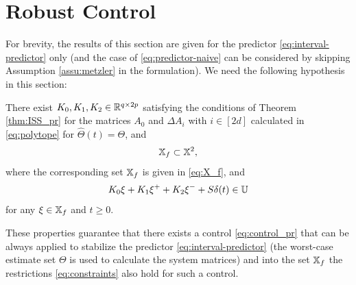 \documentclass[letterpaper, 10 pt, conference]{ieeeconf}  %
\begin{document}
\section{\label{sec:control} Robust Control}

For brevity, the results of this section are given for the predictor
\eqref{eq:interval-predictor} only (and the case of \eqref{eq:predictor-naive}
can be considered by skipping Assumption \ref{assu:metzler} in the
formulation). We need the following hypothesis in this section:
\begin{assumption}
\label{assu:ctrl} There exist $K_{0},K_{1},K_{2}\in\mathbb{R}^{q\times2p}$
satisfying the conditions of Theorem \ref{thm:ISS_pr} for the matrices
$A_{0}$ and $\Delta A_{i}$ with $i\in[2d]$ calculated in \eqref{eq:polytope}
for $\hat{\Theta}(t)=\Theta$, and
\[
\mathbb{X}_{f}\subset\mathbb{X}^{2},
\]
where the corresponding set $\mathbb{X}_{f}$ is given in \eqref{eq:X_f},
and
\[
K_{0}\xi+K_{1}\xi^{+}+K_{2}\xi^{-}+S\delta(t)\in\mathbb{U}
\]
for any $\xi\in\mathbb{X}_{f}$ and $t\geq0$.
\end{assumption}
These properties guarantee that there exists a control \eqref{eq:control_pr}
that can be always applied to stabilize the predictor \eqref{eq:interval-predictor}
(the worst-case estimate set $\Theta$ is used to calculate the system
matrices) and into the set $\mathbb{X}_{f}$ the restrictions \eqref{eq:constraints}
also hold for such a control.
\end{document}
